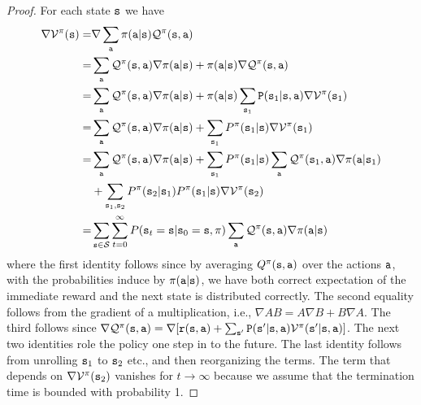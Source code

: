 \begin{proof}
For each state ${\tt s}$ we have
\begin{align*}
\nabla \mathcal{V}^\pi({\tt s}) =& \nabla \sum_{\tt a} \pi({\tt a}|{\tt s}) \mathcal{Q}^\pi({\tt s},{\tt a})\\
=&\sum_{\tt a}  \mathcal{Q}^\pi({\tt s},{\tt a}) \nabla \pi({\tt a}|{\tt s}) + \pi({\tt a}|{\tt s}) \nabla \mathcal{Q}^\pi({\tt s},{\tt a})\\
=&\sum_{\tt a}  \mathcal{Q}^\pi({\tt s},{\tt a}) \nabla \pi({\tt a}|{\tt s}) + \pi({\tt a}|{\tt s}) \sum_{{\tt s}_1} {\tt P}({\tt s}_1|{\tt s},{\tt a}) \nabla \mathcal{V}^\pi({\tt s}_1)\\
=& \sum_{\tt a}  \mathcal{Q}^\pi({\tt s},{\tt a}) \nabla
\pi({\tt a}|{\tt s}) + \sum_{{\tt s}_1} P^{\pi}({\tt s}_1|{\tt s})
\nabla \mathcal{V}^\pi({\tt s}_1)\\
=& \sum_{\tt a}  \mathcal{Q}^\pi({\tt s},{\tt a}) \nabla
\pi({\tt a}|{\tt s}) + \sum_{{\tt s}_1} P^{\pi}({\tt s}_1|{\tt s})
\sum_{\tt a} \mathcal{Q}^\pi({\tt s}_1,{\tt a}) \nabla
\pi({\tt a}|{\tt s}_1) \\
& + \sum_{{\tt s}_1, {\tt s}_2}
P^{\pi}({\tt s}_2|{\tt s}_1)P^{\pi}({\tt s}_1|{\tt s})
\nabla \mathcal{V}^\pi({\tt s}_2)\\
=& \sum_{{\tt s}\in
\mathcal{S}}\sum_{t=0}^\infty P({\tt s}_t = {\tt s} | {\tt s}_0 = {\tt s}, \pi) \sum_{\tt a}
\mathcal{Q}^\pi({\tt s},{\tt a})\nabla\pi({\tt a}|{\tt s})
\end{align*}
where the first identity follows since by averaging $Q^\pi({\tt s},{\tt a})$ over the actions ${\tt a}$, with the
probabilities induce by $\pi({\tt a}|{\tt s})$, we have both correct expectation of the immediate reward and the next state is distributed correctly. The second equality follows from the gradient of a multiplication, i.e., $\nabla AB=A\nabla B+B\nabla A$. The third follows since 
$\nabla \mathcal{Q}^\pi({\tt s},{\tt a})= \nabla
[{\tt r}({\tt s},{\tt a})+
\sum_{{\tt s}'}{\tt P}({\tt s}'|{\tt s},{\tt a})\mathcal{V}^\pi({\tt s}'|{\tt s},{\tt a})]$.
%
The next two identities role the policy one step in to the future.
%
The last identity follows from unrolling ${\tt s}_1$ to ${\tt s}_2$ etc., and then reorganizing the terms. The term that depends on $\nabla \mathcal{V}^\pi({\tt s}_2)$ vanishes for $t\to\infty$ because we assume that the termination time is bounded with probability 1.


\end{proof}
